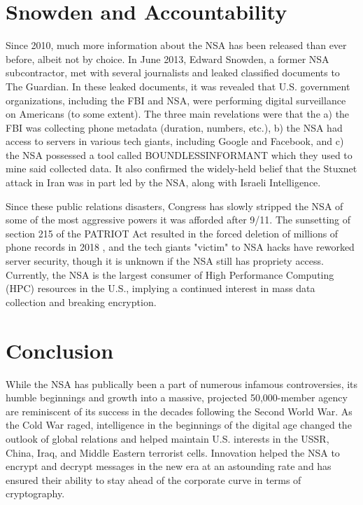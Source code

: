 \documentclass[12pt]{article}
\begin{document}
\section{Snowden and Accountability}

Since 2010, much more information about the NSA has been released than ever before, albeit not by choice. In June 2013, Edward Snowden, a former NSA subcontractor, met with several journalists and leaked classified documents to The Guardian. In these leaked documents, it was revealed that U.S. government organizations, including the FBI and NSA, were performing digital surveillance on Americans (to some extent). The three main revelations were that the a) the FBI was collecting phone metadata (duration, numbers, etc.)\cite{Donnelly_Chakrabarti_2023}, b) the NSA had access to servers in various tech giants, including Google and Facebook\cite{MacAskill_2023}, and c) the NSA possessed a tool called BOUNDLESSINFORMANT\cite{Greenwald_MacAskill_2013} which they used to mine said collected data. It also confirmed the widely-held belief that the Stuxnet attack in Iran was in part led by the NSA, along with Israeli Intelligence\cite{cyberattack}.

Since these public relations disasters, Congress has slowly stripped the NSA of some of the most aggressive powers it was afforded after 9/11. The sunsetting of section 215 of the PATRIOT Act resulted in the forced deletion of millions of phone records in 2018 \cite{snowden10}, and the tech giants "victim" to NSA hacks have reworked server security, though it is unknown if the NSA still has propriety access. Currently, the NSA is the largest consumer of High Performance Computing (HPC) resources in the U.S.\cite{secret_sentry}, implying a continued interest in mass data collection and breaking encryption. 

\section{Conclusion}

While the NSA has publically been a part of numerous infamous controversies, its humble beginnings and growth into a massive, projected 50,000-member agency are reminiscent of its success in the decades following the Second World War. As the Cold War raged, intelligence in the beginnings of the digital age changed the outlook of global relations and helped maintain U.S. interests in the USSR, China, Iraq, and Middle Eastern terrorist cells. Innovation helped the NSA to encrypt and decrypt messages in the new era at an astounding rate and has ensured their ability to stay ahead of the corporate curve in terms of cryptography. 
\end{document}
